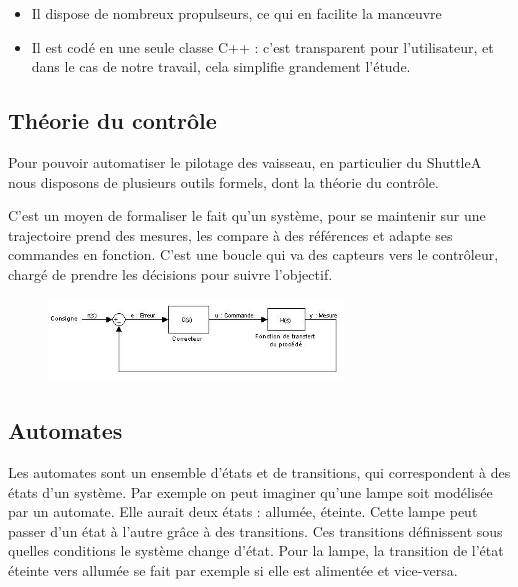 \documentclass[a4paper,11pt]{article}
\begin{document}
        \begin{itemize}
            \item Il dispose de nombreux propulseurs, ce qui en facilite la manœuvre
            \item Il est codé en une seule classe C++ : c'est transparent pour l'utilisateur, et dans le cas de notre travail, cela simplifie grandement l'étude.
        \end{itemize}


    \subsection{Théorie du contrôle}
        Pour pouvoir automatiser le pilotage des vaisseau, en particulier du ShuttleA nous disposons de plusieurs outils formels, dont la théorie du contrôle.

        C'est un moyen de formaliser le fait qu'un système, pour se maintenir sur une trajectoire prend des mesures, les compare à des références et adapte ses commandes en fonction. C'est une boucle qui va des capteurs vers le contrôleur, chargé de prendre les décisions pour suivre l'objectif.

        \begin{figure}[!h]
                    \begin{center}
                        \includegraphics[width=0.7\textwidth]{img/boucle_controle.jpg}
                    \end{center}
        \end{figure}

    \subsection{Automates}
        Les automates sont un ensemble d'états et de transitions, qui correspondent à des états d'un système. Par exemple on peut imaginer qu'une lampe soit modélisée par un automate. Elle aurait deux états : allumée, éteinte. Cette lampe peut passer d'un état à l'autre grâce à des transitions.
        Ces transitions définissent sous quelles conditions le système change d'état.
        Pour la lampe, la transition de l'état éteinte vers allumée se fait par exemple si elle est alimentée et vice-versa.
\end{document}
